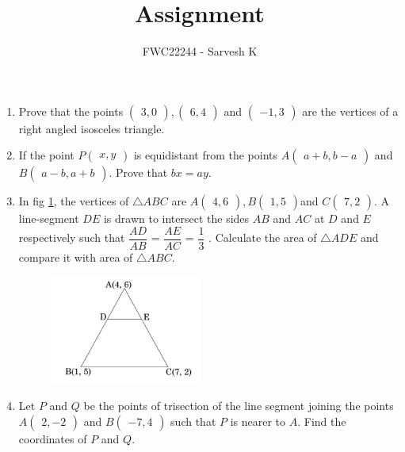 \documentclass[12pt,-letter paper]{article}
\theoremstyle{remark}
\newcommand{\myvec}[1]{\ensuremath{\begin{pmatrix}#1\end{pmatrix}}}
\begin{document}
\vspace{3cm}

\title{Assignment}
\author{FWC22244 - Sarvesh K}
\maketitle
\begin{enumerate}
      \section{Vectors}
\item  Prove that the points $\myvec{3,0}, \myvec{6, 4}$ and $\myvec{-1, 3}$ are the vertices of a right angled isosceles triangle.\\
\item  If the point $P\myvec{x, y}$ is equidistant from the points $A\myvec{a+b, b-a}$ and $B\myvec{a-b, a+b}$. Prove that $bx=ay$.\\
\item In fig \ref{figure_1}, the vertices of $\triangle ABC$ are $A\myvec{4, 6}, B\myvec{1, 5}$and $C\myvec{7, 2}$. A line-segment $DE$ is drawn to intersect the sides $AB$ and $AC$ at $D$ and $E$ respectively such that $\dfrac{AD}{AB}$ = $\dfrac{AE}{AC}$ = $\dfrac{1}{3}$ . Calculate the area of $ \triangle ADE$ and compare it with area of $ \triangle ABC$.\\
	\begin{figure}[H]
      \centering
      \includegraphics[width=5cm]{figs/8.png}
     \caption{}
      \label{figure_1}
\end{figure} 
\item  Let $P$ and $Q$ be the points of trisection of the line segment joining the points $A\myvec{2,-2}$ and $B\myvec{-7, 4}$ such that $P$ is nearer to $A$. Find the coordinates of $P$ and $Q$.\\


\end{enumerate}
\end{document}
